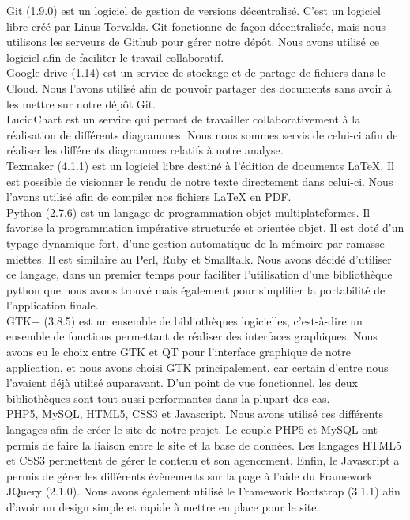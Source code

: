 \documentclass[16pts]{report}
\begin{document}
Git (1.9.0) est un logiciel de gestion de versions décentralisé.
C'est un logiciel libre créé par Linus Torvalds.
Git fonctionne de façon décentralisée, mais nous utilisons les serveurs de 
Github pour gérer notre dépôt.
Nous avons utilisé ce logiciel afin de faciliter le travail collaboratif.
\\
Google drive (1.14) est un service de stockage et de partage de fichiers 
dans le Cloud. Nous l'avons utilisé afin de pouvoir partager des documents 
sans avoir à les mettre sur notre dépôt Git. 
\\
LucidChart est un service qui permet de travailler collaborativement à la 
réalisation de différents diagrammes. Nous nous sommes servis de celui-ci 
afin de réaliser les différents diagrammes relatifs à notre analyse.
\\
Texmaker (4.1.1) est un logiciel libre destiné à l'édition de documents 
LaTeX. Il est possible de visionner le rendu de notre texte directement dans 
celui-ci. Nous l'avons utilisé afin de compiler nos fichiers LaTeX en PDF.
\\
Python (2.7.6) est un langage de programmation objet multiplateformes. 
Il favorise la programmation impérative structurée et orientée objet. Il 
est doté d'un typage dynamique fort, d'une gestion automatique de la 
mémoire par ramasse-miettes. Il est similaire au Perl, Ruby et Smalltalk. 
Nous avons décidé d'utiliser ce langage, dans un premier temps pour 
faciliter l'utilisation d'une bibliothèque python que nous avons trouvé 
mais également pour simplifier la portabilité de l'application finale.
\\
GTK+ (3.8.5) est un ensemble de bibliothèques logicielles, c'est-à-dire 
un ensemble de fonctions permettant de réaliser des interfaces graphiques. 
Nous avons eu le choix entre GTK et QT pour l'interface graphique de notre 
application, et nous avons choisi GTK principalement, car certain 
d'entre nous l'avaient déjà utilisé auparavant. D'un point de vue 
fonctionnel, les deux bibliothèques sont tout aussi performantes dans 
la plupart des cas.
\\
PHP5, MySQL, HTML5, CSS3 et Javascript. Nous avons utilisé ces différents 
langages afin de créer le site de notre projet. Le couple PHP5 et MySQL 
ont permis de faire la liaison entre le site et la base de données. Les 
langages HTML5 et CSS3 permettent de gérer le contenu et son agencement. 
Enfin, le Javascript a permis de gérer les différents évènements sur la 
page à l'aide du Framework JQuery (2.1.0). Nous avons également utilisé 
le Framework Bootstrap (3.1.1) afin d'avoir un design simple et rapide à 
mettre en place pour le site.
\end{document}
